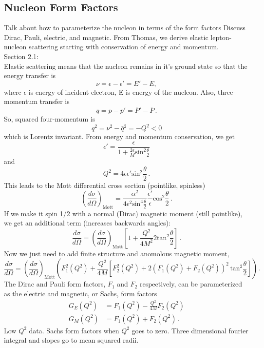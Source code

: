 \subsection{Nucleon Form Factors}
  Talk about how to parameterize the nucleon in terms of the form factors
  Discuss Dirac, Pauli, electric, and magnetic.
  From Thomas, we derive elastic lepton-nucleon scattering starting with
  conservation of energy and momentum. \\
  Section 2.1: \\
  Elastic scattering means that the nucleon remains in it's ground state so
  that the energy transfer is
  \[
      \nu = \epsilon - \epsilon' = E' - E,
   \]
  where $\epsilon$ is energy of incident electron, E is energy of the nucleon.
  Also, three-momentum transfer is
  \[
      \bar{q} = \bar{p} - \bar{p}' = \bar{P}' - \bar{P} \,.
  \]
  So, squared four-momentum is
  \[
      q^2 = \nu^2 - \bar{q}^2 = -Q^2 < 0
  \]
  which is Lorentz invariant.
  From energy and momentum conservation, we get
  \[
      \epsilon' = \frac{\epsilon}{1+\frac{2\epsilon}{M}\mathrm{sin}^2\frac{\theta}{2}}
  \]
  and
  \[
      Q^2 = 4\epsilon \epsilon' \mathrm{sin}^2 \frac{\theta}{2} \,.
  \]
  This leads to the Mott differential cross section (pointlike, spinless)
  \[
      \left(\frac{d\sigma}{d\Omega} \right)_\textrm{Mott} = \frac{\alpha^2}{4\epsilon^2 \textrm{sin}^4\frac{\theta}{2}}\frac{\epsilon'}{\epsilon}\textrm{cos}^2\frac{\theta}{2} \,.
  \]
  If we make it spin 1/2 with a normal (Dirac) magnetic moment (still pointlike), we get an additional term (increases backwards angles):
  \[
      \frac{d\sigma}{d\Omega} = \left(\frac{d\sigma}{d\Omega} \right)_\textrm{Mott} \left[ 1 + \frac{Q^2}{4M^2}2\mathrm{tan}^2\frac{\theta}{2} \right] \,.
  \]
  Now we just need to add finite structure and anomolous magnetic moment,
  \[
      \frac{d\sigma}{d\Omega} = \left(\frac{d\sigma}{d\Omega} \right)_\textrm{Mott} 
      \left(F_1^2(Q^2) +\frac{Q^2}{4M}\left[F_2^2(Q^2)+2(F_1(Q^2)+F_2(Q^2))^2\,\textrm{tan}^2\frac{\theta}{2} \right] \right) \,.
  \]
  The Dirac and Pauli form factors, $F_1$ and $F_2$ respectively, can be parameterized as the electric and magnetic, or Sachs, form factors
  \begin{align}
      G_E(Q^2) &= F_1(Q^2) - \frac{Q^2}{4M}F_2(Q^2) \\
      G_M(Q^2) &= F_1(Q^2) + F_2(Q^2) \,.
  \end{align}
  Low $Q^2$ data. Sachs form factors when $Q^2$ goes to zero. Three dimensional fourier integral and slopes go to mean squared radii.

